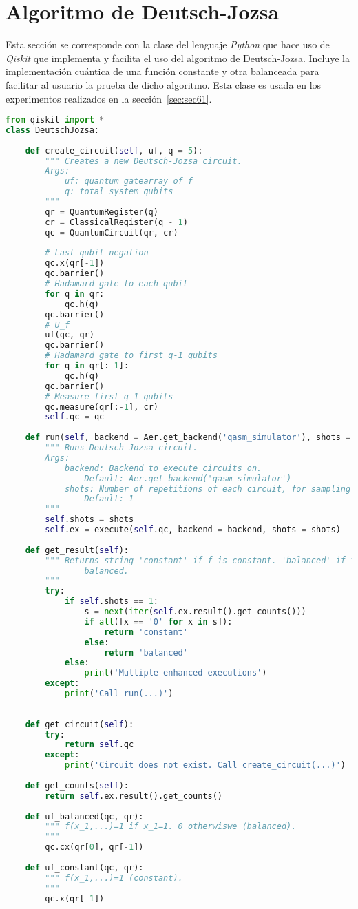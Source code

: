 \section{Algoritmo de Deutsch-Jozsa}
\label{sec:seca3}
Esta sección se corresponde con la clase del lenguaje \textit{Python} que hace uso de \textit{Qiskit} que implementa y facilita el uso del algoritmo de Deutsch-Jozsa. Incluye la implementación cuántica de una función constante y otra balanceada para facilitar al usuario la prueba de dicho algoritmo. Esta clase es usada en los experimentos realizados en la sección~\ref{sec:sec61}.
\begin{lstlisting}[language=Python]
from qiskit import *
class DeutschJozsa:
        
    def create_circuit(self, uf, q = 5):
        """ Creates a new Deutsch-Jozsa circuit.
        Args:
            uf: quantum gatearray of f
            q: total system qubits
        """
        qr = QuantumRegister(q)
        cr = ClassicalRegister(q - 1)
        qc = QuantumCircuit(qr, cr)
        
        # Last qubit negation
        qc.x(qr[-1])
        qc.barrier()
        # Hadamard gate to each qubit
        for q in qr:
            qc.h(q)
        qc.barrier()
        # U_f
        uf(qc, qr)
        qc.barrier()
        # Hadamard gate to first q-1 qubits
        for q in qr[:-1]:
            qc.h(q)
        qc.barrier()  
        # Measure first q-1 qubits
        qc.measure(qr[:-1], cr)
        self.qc = qc
    
    def run(self, backend = Aer.get_backend('qasm_simulator'), shots = 1):
        """ Runs Deutsch-Jozsa circuit.
        Args:
            backend: Backend to execute circuits on.
                Default: Aer.get_backend('qasm_simulator')
            shots: Number of repetitions of each circuit, for sampling.
                Default: 1
        """
        self.shots = shots
        self.ex = execute(self.qc, backend = backend, shots = shots)
    
    def get_result(self):
        """ Returns string 'constant' if f is constant. 'balanced' if f is
                balanced.
        """
        try:
            if self.shots == 1:
                s = next(iter(self.ex.result().get_counts()))
                if all([x == '0' for x in s]):
                    return 'constant'
                else:
                    return 'balanced'
            else:
                print('Multiple enhanced executions')
        except:
            print('Call run(...)')
                
    
    def get_circuit(self):
        try:
            return self.qc
        except:
            print('Circuit does not exist. Call create_circuit(...)')
    
    def get_counts(self):
        return self.ex.result().get_counts()
                
    def uf_balanced(qc, qr):
        """ f(x_1,...)=1 if x_1=1. 0 otherwiswe (balanced).
        """
        qc.cx(qr[0], qr[-1])
        
    def uf_constant(qc, qr):
        """ f(x_1,...)=1 (constant).
        """
        qc.x(qr[-1])  
\end{lstlisting}
